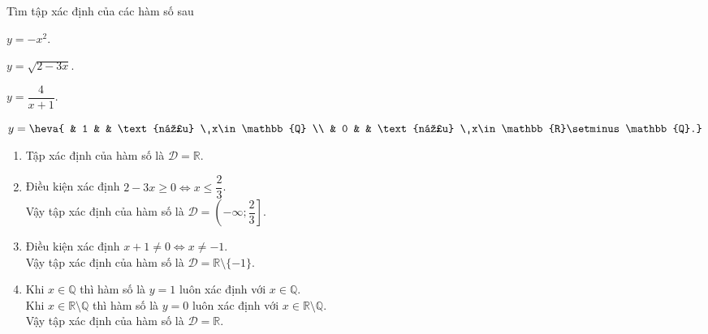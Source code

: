 \begin{bt}%
	Tìm tập xác định của các hàm số sau
	\begin{enumerate}[\indent a)]
		\begin{minipage}{0.5\linewidth}
			\item $y=-x^2$.
		\end{minipage} \begin{minipage}{0.5\linewidth}
			\item $y=\sqrt{2-3x}$.
		\end{minipage}
		\begin{minipage}{0.5\linewidth}
			\item $y=\dfrac{4}{x+1}$.
		\end{minipage} \begin{minipage}{0.5\linewidth}
			\item $y=\heva{ & 1 & & \text{nếu} \ x\in\mathbb{Q} \\ & 0 & & \text{nếu} \ x\in\mathbb{R}\setminus\mathbb{Q}.}$
		\end{minipage}
	\end{enumerate}
	\loigiai
	{
		\begin{enumerate}[\indent a)]
			\item Tập xác định của hàm số là $\mathscr{D}=\mathbb{R}$.
			\item Điều kiện xác định $2-3x\geqslant0 \Leftrightarrow x\leqslant\dfrac{2}{3}$. \\
			Vậy tập xác định của hàm số là $\mathscr{D}=\left(-\infty;\dfrac{2}{3}\right]$.
			\item Điều kiện xác định $x+1\neq0 \Leftrightarrow x\neq-1$. \\
			Vậy tập xác định của hàm số là $\mathscr{D}=\mathbb{R}\setminus\{-1\}$.
			\item Khi $x\in\mathbb{Q}$ thì hàm số là $y=1$ luôn xác định với $x\in\mathbb{Q}$. \\
			Khi $x\in\mathbb{R}\setminus\mathbb{Q}$ thì hàm số là $y=0$ luôn xác định với $x\in\mathbb{R}\setminus\mathbb{Q}$. \\
			Vậy tập xác định của hàm số là $\mathscr{D}=\mathbb{R}$.
		\end{enumerate}
	}
\end{bt}

